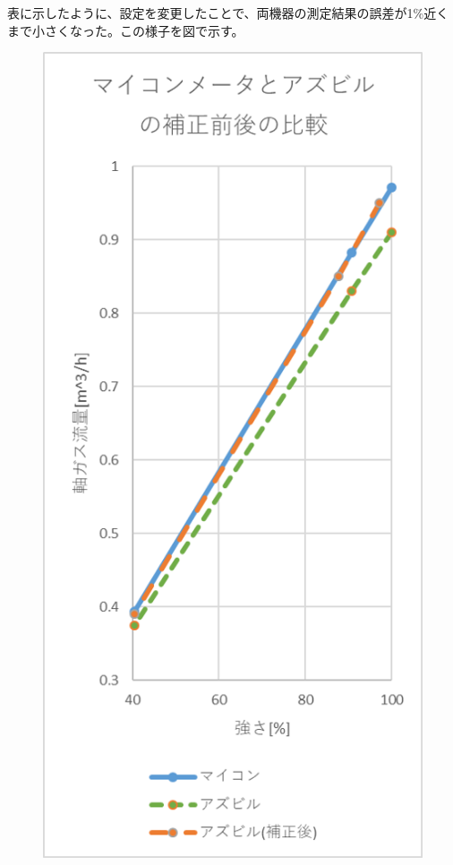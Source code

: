 \documentclass[upLaTeX,11pt]{ujarticle}
\begin{document}
表に示したように、設定を変更したことで、両機器の測定結果の誤差が1\%近くまで小さくなった。この様子を図で示す。
\begin{figure}[H]
    \centering
    \includegraphics{result3.png}
    \caption{}
\end{figure} 
\end{document}
